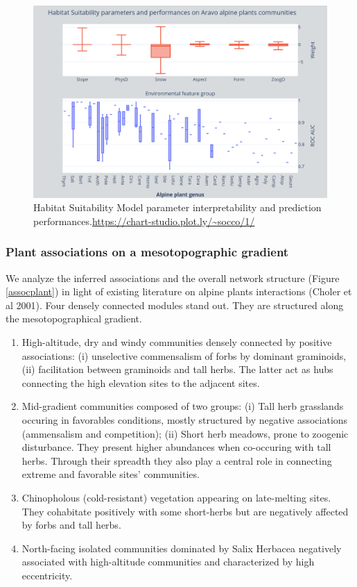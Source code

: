 \documentclass[]{article}
\newcommand{\commG}[1]{#1}
\begin{document}
\begin{figure}[H]
	\centering
	\commG{\includegraphics[scale=0.22]{hsmaravo}}
	\caption{Habitat Suitability Model parameter interpretability and prediction performances.\url{https://chart-studio.plot.ly/~socco/1/}}
	\label{hsmaravo}
\end{figure}

\subsubsection{Plant associations on a mesotopographic gradient}
We analyze the inferred associations and the overall network structure (Figure \ref{assocplant}) in light of existing literature on alpine plants interactions (Choler et al 2001). Four densely connected modules stand out. They are structured along the mesotopographical gradient. 
\begin{enumerate}
	\item High-altitude, dry and windy communities densely connected by positive associations: (i) unselective commensalism of forbs by dominant graminoids, (ii) facilitation between graminoids and tall herbs. The latter act as hubs connecting the high elevation sites to the adjacent sites. 
	\item Mid-gradient communities composed of two groups: (i) Tall herb grasslands occuring in favorables conditions, mostly structured by negative associations (ammensalism and competition); (ii) Short herb meadows, prone to zoogenic disturbance. They present higher abundances when co-occuring with tall herbs. Through their spreadth they also play a central role in connecting extreme and favorable sites' communities. 
	\item Chinopholous (cold-resistant) vegetation appearing on late-melting sites. They cohabitate positively with some short-herbs but are negatively affected by forbs and tall herbs. 
	\item North-facing isolated communities dominated by Salix Herbacea negatively associated with high-altitude communities and characterized by high eccentricity.
\end{enumerate}
\end{document}
